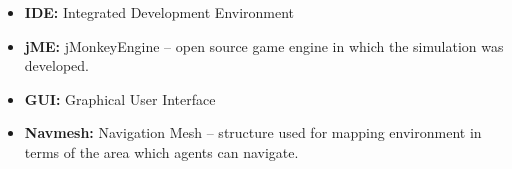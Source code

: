 \begin{itemize}
\item{\textbf{IDE:} Integrated Development Environment}
\item{\textbf{jME:} jMonkeyEngine -- open source game engine in which the simulation was developed.}
\item{\textbf{GUI:} Graphical User Interface}
\item{\textbf{Navmesh:} Navigation Mesh -- structure used for mapping environment in terms of the area which agents can navigate.}
\end{itemize}

